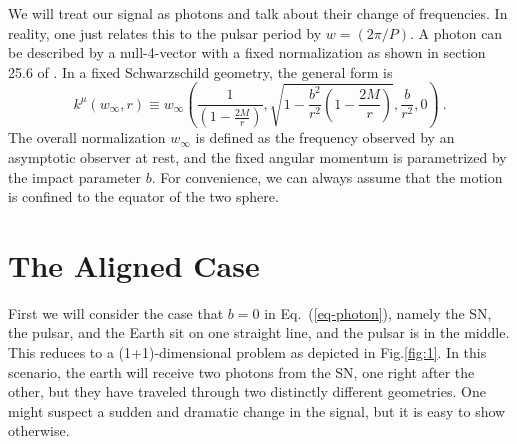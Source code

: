 \documentclass[aps,showpacs,onecolumn,floats,prd,superscriptaddress,nofootinbib]{revtex4}
\begin{document}
We will treat our signal as photons and talk about their change of frequencies. In reality, one just relates this to the pulsar period by $w=(2\pi/P)$. A photon can be described by a null-4-vector with a fixed normalization as shown in section 25.6 of \cite{MTW}. In a fixed Schwarzschild geometry, the general form is
\begin{equation}
	k^\mu(w_\infty, r) \equiv w_{\infty}\left( \frac{1}{(1- \frac{2M}{r})}, \sqrt{ 1 - \frac{b^2}{r^2} \left( 1 - \frac{2M}{r} \right)}, \frac{b}{r^2}, 0 \right)~. \label{eq-photon}	
\end{equation}
The overall normalization $w_{\infty}$ is defined as the frequency observed by an asymptotic observer at rest, and the fixed angular momentum is parametrized by the impact parameter $b$. For convenience, we can always assume that the motion is confined to the equator of the two sphere.

\section{The Aligned Case}
\label{sec-1+1}

First we will consider the case that $b=0$ in Eq.~(\ref{eq-photon}), namely the SN, the pulsar, and the Earth sit on one straight line, and the pulsar is in the middle. This reduces to a (1+1)-dimensional problem as depicted in Fig.\ref{fig:1}. In this scenario, the earth will receive two photons from the SN, one right after the other, but they have traveled through two distinctly different geometries. One might suspect a sudden and dramatic change in the signal, but it is easy to show otherwise.
\end{document}
